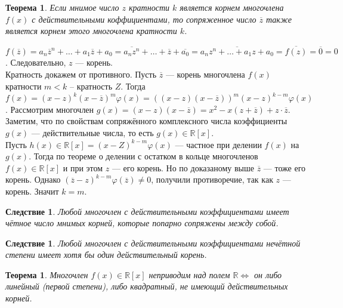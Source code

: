 \newtheorem*{885}{Теорема}\begin{885}
	Если мнимое число $z$ кратности $k$ является корнем многочлена $f(x)$ с действительными 
	коффициентами, то сопряженное число $\overline{z}$ также является корнем этого многочлена кратности $k$. 
\end{885}
\begin{Proof}
	$f(\overline{z}) = a_n\overline{z}^n + \ldots +a_1\overline{z} + a_0 = \overline{a_n z^n}+ \ldots + \overline{z}+\overline{a_0} = \overline{a_nz^n + \ldots +a_1z + a_0}= \overline{f(z)} = \overline{0} = 0$. Следовательно, $z$ --- корень.\\
	Кратность докажем от противного. Пусть $\overline{z}$ --- корень многочлена $f(x)$ кратности $m < k$ – кратность $Z$. Тогда $f(x) = 
	(x - z)^k
	(x - \overline{z})^m \varphi(x) = ((x - z)(x - \overline{z}))^m(x - z)^{k-m} \varphi(x)$. Рассмотрим многочлен $g(x) = (x - z)(x - \overline{z}) = x^2 - x(z + \overline{z}) + z \cdot \overline{z}$. Заметим, что по свойствам сопряжённого комплексного числа коэффициенты $g(x)$ --- действительные числа, то есть $g(x)\in  \mathbb{R}[x]$.\\
	Пусть $h(x) \in \mathbb{R}[x] = (x - Z)^{k-m} \varphi(x)$ --– частное при делении $f(x)$ на $g(x)$. Тогда по теореме о делении с остатком в кольце многочленов $f(x) \in \mathbb{R}[x]$ и при этом $z$ --- его корень. Но по доказаному выше $\overline{z}$ --- тоже его корень. Однако $(\overline{z} - z)^{k-m} \varphi(\overline{z}) \not= 0$, получили противоречие, так как $z$ --- корень. Значит $k = m$. 
\end{Proof}
\newtheorem*{886}{Следствие}\begin{886}
	Любой многочлен с действительными коэффициентами имеет чётное число
	мнимых корней, которые попарно сопряжены между собой.
\end{886}
\newtheorem*{887}{Следствие}\begin{887}
	Любой многочлен с действительными коэффициентами нечётной степени имеет хотя бы один действительный корень. 
\end{887}
\newtheorem*{888}{Теорема}\begin{888}
	Многочлен $f(x)\in \mathbb{R}[x]$ неприводим над полем $\mathbb{R} \Longleftrightarrow$ он либо линейный (первой 
	степени), либо квадратный, не имеющий действительных корней. 
\end{888}
